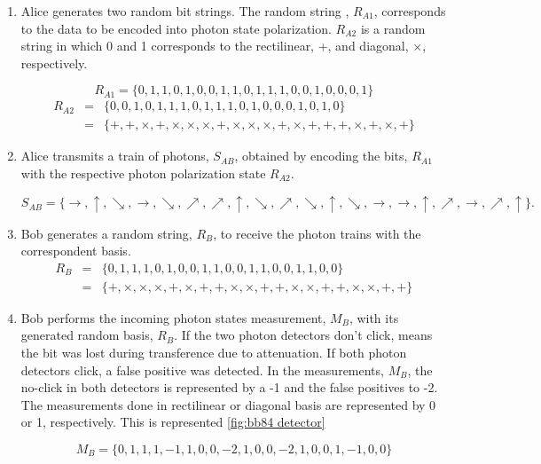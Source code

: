 \begin{enumerate}
	\item Alice generates two random bit strings. The random string , $R_{A1}$, corresponds to the data to be encoded into photon state polarization. $R_{A2}$ is a random string in which 0 and 1 corresponds to the rectilinear, +, and diagonal, $\times$, respectively.
	
	$$ R_{A1} = \{0,1,1,0,1,0,0,1,1,0,1,1,1,0,0,1,0,0,0,1\}$$
	\begin{eqnarray}
		R_{A2} &=& \{0,0,1,0,1,1,1,0,1,1,1,0,1,0,0,0,1,0,1,0\} \nonumber \\
		&=& \{+,+,\times,+,\times, \times, \times, +,\times, \times, \times,+,\times,+,+,+,\times,+,\times,+\}\nonumber
	\end{eqnarray}
	
	\item Alice transmits a train of photons, $S_{AB}$, obtained by encoding the bits, $R_{A1}$ with the respective photon polarization state $R_{A2}$.
	
	$$S_{AB} = \{\to, \uparrow, \searrow, \to, \searrow, \nearrow, \nearrow, \uparrow, \searrow, \nearrow, \searrow, \uparrow, \searrow, \to, \to, \uparrow, \nearrow, \to, \nearrow, \uparrow\}.$$
	
	\item Bob generates a random string, $R_{B}$, to receive the photon trains with the correspondent basis.
	\begin{eqnarray}
		R_{B} &=& \{0,1,1,1,0,1,0,0,1,1,0,0,1,1,0,0,1,1,0,0\} \nonumber\\
		&=&\{+,\times,\times,\times,+,\times,+,+,\times,\times,+,+,\times,\times,+,+,\times,\times,+,+\} \nonumber
	\end{eqnarray}
	
	\item Bob performs the incoming photon states measurement, $M_{B}$, with its generated random basis, $R_{B}$. If the two photon detectors don't click, means the bit was lost during transference due to attenuation. If both photon detectors click, a false positive was detected. In the measurements, $M_{B}$, the no-click in both detectors is represented by a -1 and the false positives to -2. The measurements done in rectilinear or diagonal basis are represented by 0 or 1, respectively. This is represented \ref{fig:bb84 detector}
	
	$$M_{B} = \{0,1,1,1,-1,1,0,0,-2,1,0,0,-2,1,0,0,1,-1,0,0\}$$	


\end{enumerate}
